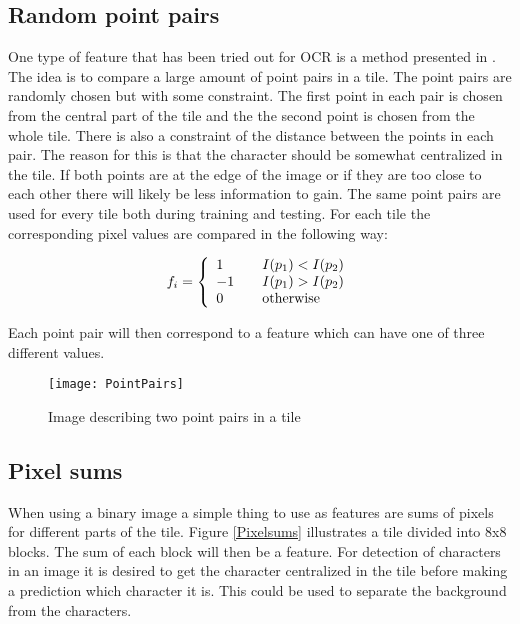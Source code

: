 \subsection{Random point pairs}
\label{sec:Random point pairs}
One type of feature that has been tried out for OCR is a method presented in \citep{Nenad}. The idea is to compare a large amount of point pairs in a tile. The point pairs are randomly chosen but with some constraint. The first point in each pair is chosen from the central part of the tile and the the second point is chosen from the whole tile. There is also a constraint of the distance between the points in each pair. The reason for this is that the character should be somewhat centralized in the tile. If both points are at the edge of the image or if they are too close to each other there will likely be less information to gain. The same point pairs are used for every tile both during training and testing. For each tile the corresponding pixel values are compared in the following way:

 \begin{equation}
 f_i = \left\{ 
   \begin{array}{l l l}
     1 & \quad I(p_1)<I(p_2)\\
     -1 & \quad I(p_1)>I(p_2)\\
     0 & \quad \text{otherwise}
   \end{array} \right.
 \end{equation}
 
Each point pair will then correspond to a feature which can have one of three different values. 
\begin{figure}[H]
\centering
	\texttt{[image: PointPairs]}
	\caption{Image describing two point pairs in a tile}
	\label{PointPairs}
\end{figure}

\subsection{Pixel sums}
\label{sec:Pixel sums}
When using a binary image a simple thing to use as features are sums of pixels for different parts of the tile. Figure \ref{Pixelsums} illustrates a tile divided into 8x8 blocks. The sum of each block will then be a feature. For detection of characters in an image it is desired to get the character centralized in the tile before making a prediction which character it is. This could be used to separate the background from the characters.  

